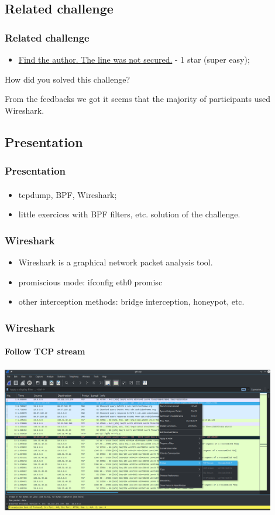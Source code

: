 \documentclass[]{beamer}
\begin{document}
\subsection{Related challenge}
\begin{frame}
\frametitle{Related challenge}
\begin{itemize}
    \item \href{https://github.com/cscluxembourg/vestatech/blob/master/challenges/find-the-author/gift.cap}{Find the author. The line was not secured.} - 1 star (super easy);
\end{itemize}
\bigskip
How did you solved this challenge?

\bigskip
From the feedbacks we got it seems that the majority of participants used Wireshark.
\end{frame}


\subsection{Presentation}
\begin{frame}
\frametitle{Presentation}
\framesubtitle{}
\begin{itemize}
\item tcpdump, BPF, Wireshark;
\item little exercices with BPF filters, etc. solution of the challenge.
\end{itemize}
\end{frame}




\begin{frame}
\frametitle{Wireshark}
\begin{itemize}
    \item Wireshark is a graphical network packet analysis tool.
    \item promiscious mode: ifconfig eth0 promisc
    \item other interception methods: bridge interception, honeypot, etc.
\end{itemize}
\end{frame}

\begin{frame}
\frametitle{Wireshark}
\framesubtitle{Follow TCP stream}
\begin{center}
    \includegraphics[height=6.5cm, width=12.0cm]{./images/Wireshark_follow_tcp_stream.png}
\end{center}
\end{frame}
\end{document}
